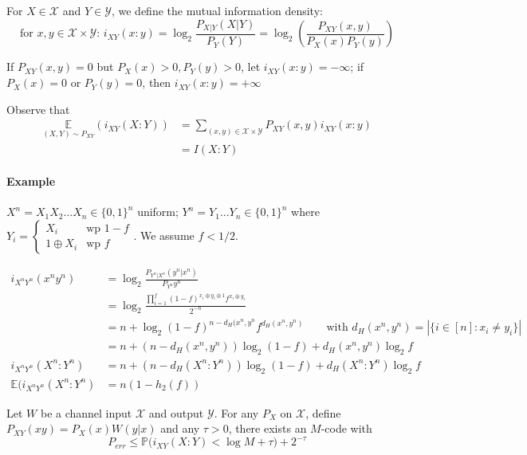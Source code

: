 \begin{defi}
For $X \in \mathcal{X}$ and $Y \in \mathcal{Y}$, we define the mutual information density:
\[\text{for $x,y \in \mathcal{X} \times \mathcal{Y}$: } i_{XY}(x:y)=\log_2 \frac{P_{X|Y}(X|Y)}{P_Y(Y)}=\log_2\left( \frac{P_{XY}(x,y)}{P_X(x)P_Y(y)} \right)\]

If $P_{XY}(x,y)=0$ but $P_X(x)>0, P_Y(y)>0$, let $i_{XY}(x:y)=-\infty$; if $P_X(x)=0$ or $P_Y(y)=0$, then $i_{XY}(x:y)=+\infty$
\end{defi}
Observe that 
\begin{align*}
\underset{(X,Y)\sim P_{XY}}{\mathbb{E}} (i_{XY}(X:Y)) & = \sum_{(x,y)\in \mathcal{X}\times \mathcal{Y}} P_{XY}(x,y)i_{XY}(x:y)\\
&= I(X:Y)
\end{align*}

\paragraph{Example} $X^n=X_1X_2...X_n\in \{0,1\}^n$ uniform; $Y^n=Y_1...Y_n \in \{0,1\}^n$ where\\
$Y_i= \begin{cases}
X_i & \text{wp } 1-f\\
1 \oplus X_i & \text{wp } f
\end{cases}$. We assume $f<1/2$.

\begin{align*}
i_{X^nY^n}(x^n y^n) & = \log_2 \frac{P_{Y^n|X^n}(y^n|x^n)}{P_{Y^n}{y^n}}\\
& = \log_2 \frac{\prod_{i=1}^f (1-f)^{x_i \oplus y_i \oplus 1} f^{x_i \oplus y_i}}{2^{-n}}\\
& = n + \log_2 (1-f)^{n-d_{H}(x^n,y^n}f^{d_H(x^n,y^n)}\qquad \text{with } d_H(x^n,y^n)=|\{i\in [n]:x_i\neq y_i\}|\\
&= n + (n-d_H(x^n,y^n))\log_2(1-f)+d_H(x^n,y^n)\log_2 f\\
i_{X^nY^n}(X^n:Y^n) & = n+(n-d_H(X^n:Y^n))\log_2(1-f)+d_H(X^n:Y^n)\log_2 f\\
\mathbb{E}(i_{X^nY^n}(X^n:Y^n) & = n (1-h_2(f))
\end{align*}

\begin{thm}
Let $W$ be a channel input $\mathcal{X}$ and output $\mathcal{Y}$. For any $P_X$ on $\mathcal{X}$, define $P_{XY}(xy)=P_X(x)W(y|x)$ and any $\tau > 0$, there exists an $M$-code with
\[P_{err} \leq \mathbb{P}\big(i_{XY}(X:Y)< \log M + \tau\big)+2^{-\tau}\]
\end{thm}

